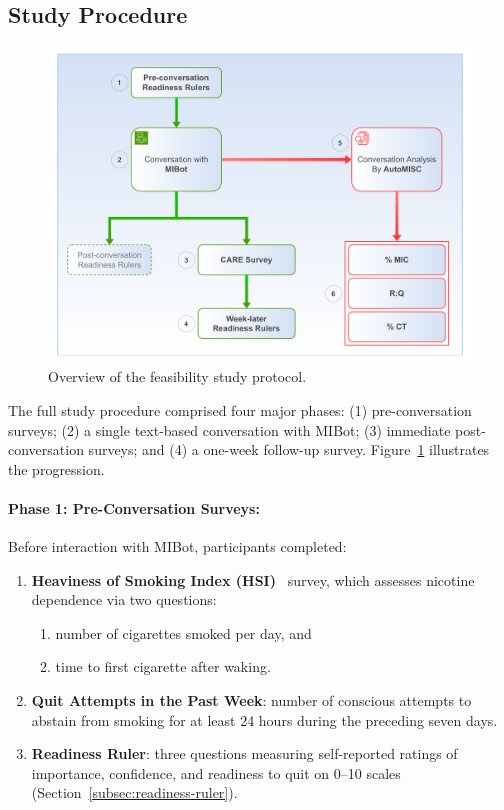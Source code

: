 \subsection{Study Procedure}
\begin{figure}[ht]
    \centering
    \includegraphics[width=0.9\linewidth]{fig/feasibility_study_flow.pdf}
    \caption{Overview of the feasibility study protocol.}
    \label{fig:study-flow}
\end{figure}

The full study procedure comprised four major phases: (1) pre-conversation surveys; (2) a single text-based conversation with MIBot; (3) immediate post-conversation surveys; and (4) a one-week follow-up survey. Figure~\ref{fig:study-flow} illustrates the progression.



\paragraph{Phase 1: Pre-Conversation Surveys:}
Before interaction with MIBot, participants completed:
\begin{enumerate}
    \item \textbf{Heaviness of Smoking Index (HSI)}~\citep{heatherton1989measuring} survey, which assesses nicotine dependence via two questions: 
        \begin{enumerate}
            \item number of cigarettes smoked per day, and
            \item time to first cigarette after waking.
        \end{enumerate}
    \item \textbf{Quit Attempts in the Past Week}: number of conscious attempts to abstain from smoking for at least 24 hours during the preceding seven days.
    \item \textbf{Readiness Ruler}: three questions measuring self-reported ratings of importance, confidence, and readiness to quit on 0–10 scales (Section~\ref{subsec:readiness-ruler}).
\end{enumerate}

